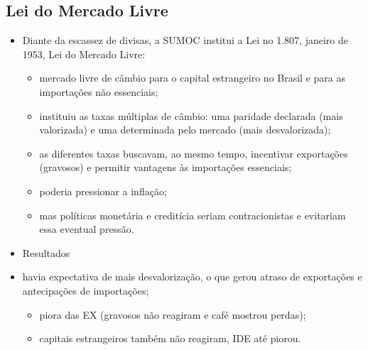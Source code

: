 \documentclass[a4paper,12pt]{article}[abntex2]
\begin{document}
\subsection{Lei do Mercado Livre}
\begin{itemize}
    \item Diante da escassez de divisas, a SUMOC institui a Lei no 1.807, janeiro de 1953, Lei do Mercado Livre:
    \begin{itemize}
        \item mercado livre de câmbio para o capital estrangeiro no Brasil e para as importações não essenciais;
    \end{itemize}
    \begin{itemize}
        \item instituiu as taxas múltiplas de câmbio: uma paridade declarada (mais valorizada) e uma determinada pelo mercado (mais desvalorizada);
    \end{itemize}
    \begin{itemize}
        \item as diferentes taxas buscavam, ao mesmo tempo, incentivar exportações (gravosos) e permitir vantagens às importações essenciais;
        \item poderia pressionar a inflação;
        \item mas políticas monetária e creditícia seriam contracionistas e evitariam essa eventual pressão.
    \end{itemize}

\end{itemize}
\begin{itemize}
    \item Resultados
    \item havia expectativa de mais desvalorização, o que gerou atraso de exportações e antecipações de importações;
    \begin{itemize}
        \item piora das EX (gravosos não reagiram e café mostrou perdas);
    \end{itemize} 
    \begin{itemize}
        \item capitais estrangeiros também não reagiram, IDE até piorou.
    \end{itemize}
\end{itemize}
\end{document}
